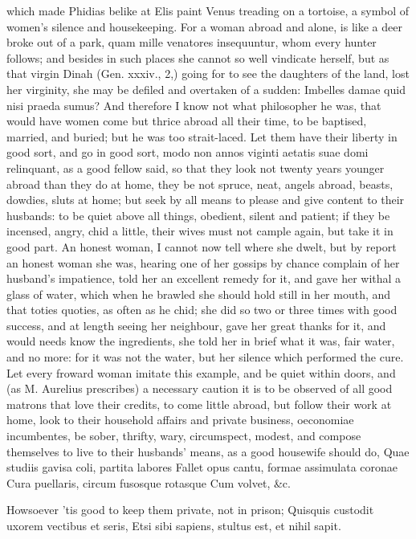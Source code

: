 {which made Phidias belike at Elis paint Venus treading on a tortoise, a
symbol of women's silence and housekeeping. For a woman abroad and
alone, is like a deer broke out of a park, quam mille venatores
insequuntur, whom every hunter follows; and besides in such places she
cannot so well vindicate herself, but as that virgin Dinah (Gen.
xxxiv., 2,) going for to see the daughters of the land, lost her
virginity, she may be defiled and overtaken of a sudden: Imbelles damae
quid nisi praeda sumus? 
And therefore I know not what philosopher he was, that would have women
come but thrice abroad all their time, to be baptised, married,
and buried; but he was too strait-laced. Let them have their liberty in
good sort, and go in good sort, modo non annos viginti aetatis suae
domi relinquant, as a good fellow said, so that they look not twenty
years younger abroad than they do at home, they be not spruce, neat,
angels abroad, beasts, dowdies, sluts at home; but seek by all means to
please and give content to their husbands: to be quiet above all
things, obedient, silent and patient; if they be incensed, angry, chid
a little, their wives must not cample again, but take it in good
part. An honest woman, I cannot now tell where she dwelt, but by report
an honest woman she was, hearing one of her gossips by chance complain
of her husband's impatience, told her an excellent remedy for it, and
gave her withal a glass of water, which when he brawled she should hold
still in her mouth, and that toties quoties, as often as he chid; she
did so two or three times with good success, and at length seeing her
neighbour, gave her great thanks for it, and would needs know the
ingredients, she told her in brief what it was, fair water, and
no more: for it was not the water, but her silence which performed the
cure. Let every froward woman imitate this example, and be quiet within
doors, and (as M. Aurelius prescribes) a necessary caution it is
to be observed of all good matrons that love their credits, to come
little abroad, but follow their work at home, look to their household
affairs and private business, oeconomiae incumbentes, be sober,
thrifty, wary, circumspect, modest, and compose themselves to live to
their husbands' means, as a good housewife should do,
Quae studiis gavisa coli, partita labores
Fallet opus cantu, formae assimulata coronae
Cura puellaris, circum fusosque rotasque
Cum volvet, \&c.

Howsoever 'tis good to keep them private, not in prison;
Quisquis custodit uxorem vectibus et seris,
Etsi sibi sapiens, stultus est, et nihil sapit.

}
